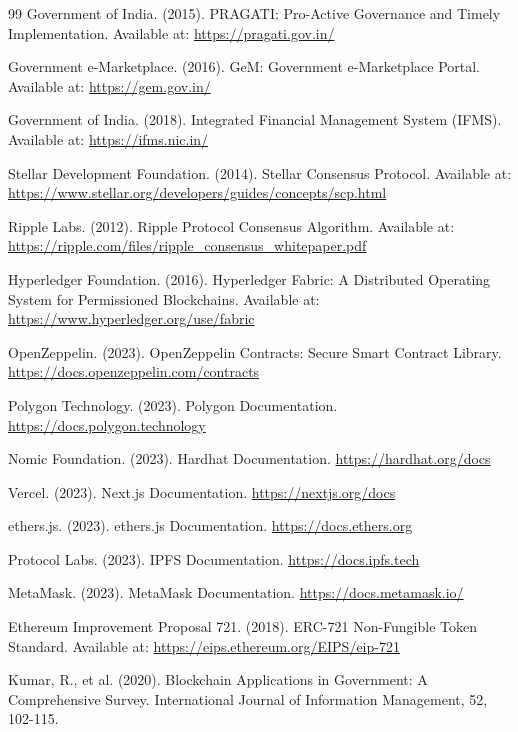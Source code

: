 \documentclass[12pt,a4wide]{report}
\theoremstyle{plain}
\theoremstyle{definition}
\theoremstyle{remark}
\begin{document}
\begin{thebibliography}{99}
Government of India. (2015). PRAGATI: Pro-Active Governance and Timely Implementation. Available at: \url{https://pragati.gov.in/}

Government e-Marketplace. (2016). GeM: Government e-Marketplace Portal. Available at: \url{https://gem.gov.in/}

Government of India. (2018). Integrated Financial Management System (IFMS). Available at: \url{https://ifms.nic.in/}

Stellar Development Foundation. (2014). Stellar Consensus Protocol. Available at: \url{https://www.stellar.org/developers/guides/concepts/scp.html}

Ripple Labs. (2012). Ripple Protocol Consensus Algorithm. Available at: \url{https://ripple.com/files/ripple_consensus_whitepaper.pdf}

Hyperledger Foundation. (2016). Hyperledger Fabric: A Distributed Operating System for Permissioned Blockchains. Available at: \url{https://www.hyperledger.org/use/fabric}

OpenZeppelin. (2023). OpenZeppelin Contracts: Secure Smart Contract Library. \url{https://docs.openzeppelin.com/contracts}

Polygon Technology. (2023). Polygon Documentation. \url{https://docs.polygon.technology}

Nomic Foundation. (2023). Hardhat Documentation. \url{https://hardhat.org/docs}

Vercel. (2023). Next.js Documentation. \url{https://nextjs.org/docs}

ethers.js. (2023). ethers.js Documentation. \url{https://docs.ethers.org}

Protocol Labs. (2023). IPFS Documentation. \url{https://docs.ipfs.tech}

MetaMask. (2023). MetaMask Documentation. \url{https://docs.metamask.io/}

Ethereum Improvement Proposal 721. (2018). ERC-721 Non-Fungible Token Standard. Available at: \url{https://eips.ethereum.org/EIPS/eip-721}

Kumar, R., et al. (2020). Blockchain Applications in Government: A Comprehensive Survey. International Journal of Information Management, 52, 102-115.

\end{thebibliography}
\end{document}
